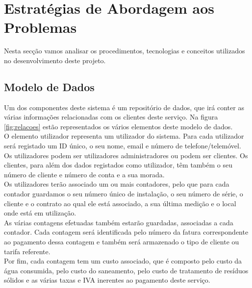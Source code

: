 \chapter{Estratégias de Abordagem aos Problemas} \label{cap:abordagem}
Nesta secção vamos analisar os procedimentos, tecnologias e conceitos utilizados no desenvolvimento deste projeto.

\section{Modelo de Dados} \label{sec:dados}
Um dos componentes deste sistema é um repositório de dados, que irá conter as várias informações relacionadas com os clientes deste serviço. Na figura \ref{fig:relacoes} estão representados os vários elementos deste modelo de dados. \\
O elemento utilizador representa um utilizador do sistema. Para cada utilizador será registado um ID único, o seu nome, email e número de telefone/telemóvel. Os utilizadores podem ser utilizadores administradores ou podem ser clientes. Os clientes, para além dos dados registados como utilizador, têm também o seu número de cliente e número de conta e a sua morada. \\
Os utilizadores terão associado um ou mais contadores, pelo que para cada contador guardamos o seu número único de instalação, o seu número de série, o cliente e o contrato ao qual ele está associado, a sua última medição e o local onde está em utilização. \\
As várias contagens efetuadas também estarão guardadas, associadas a cada contador. Cada contagem será identificada pelo número da fatura correspondente ao pagamento dessa contagem e também será armazenado o tipo de cliente ou tarifa referente. \\
Por fim, cada contagem tem um custo associado, que é composto pelo custo da água consumida, pelo custo do saneamento, pelo custo de tratamento de resíduos sólidos e as várias taxas e IVA inerentes ao pagamento deste serviço.

